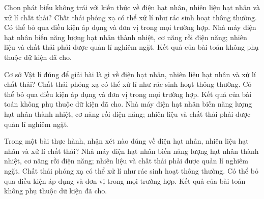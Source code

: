 \begin{ex}
Chọn phát biểu không trái với kiến thức về điện hạt nhân, nhiên liệu hạt nhân và xử lí chất thải?
\choice
{Chất thải phóng xạ có thể xử lí như rác sinh hoạt thông thường.}
{Có thể bỏ qua điều kiện áp dụng và đơn vị trong mọi trường hợp.}
{\True Nhà máy điện hạt nhân biến năng lượng hạt nhân thành nhiệt, cơ năng rồi điện năng; nhiên liệu và chất thải phải được quản lí nghiêm ngặt.}
{Kết quả của bài toán không phụ thuộc dữ kiện đã cho.}
\end{ex}

\begin{ex}
Cơ sở Vật lí đúng để giải bài là gì về điện hạt nhân, nhiên liệu hạt nhân và xử lí chất thải?
\choice
{Chất thải phóng xạ có thể xử lí như rác sinh hoạt thông thường.}
{Có thể bỏ qua điều kiện áp dụng và đơn vị trong mọi trường hợp.}
{Kết quả của bài toán không phụ thuộc dữ kiện đã cho.}
{\True Nhà máy điện hạt nhân biến năng lượng hạt nhân thành nhiệt, cơ năng rồi điện năng; nhiên liệu và chất thải phải được quản lí nghiêm ngặt.}
\end{ex}

\begin{ex}
Trong một bài thực hành, nhận xét nào đúng về điện hạt nhân, nhiên liệu hạt nhân và xử lí chất thải?
\choice
{\True Nhà máy điện hạt nhân biến năng lượng hạt nhân thành nhiệt, cơ năng rồi điện năng; nhiên liệu và chất thải phải được quản lí nghiêm ngặt.}
{Chất thải phóng xạ có thể xử lí như rác sinh hoạt thông thường.}
{Có thể bỏ qua điều kiện áp dụng và đơn vị trong mọi trường hợp.}
{Kết quả của bài toán không phụ thuộc dữ kiện đã cho.}
\end{ex}

